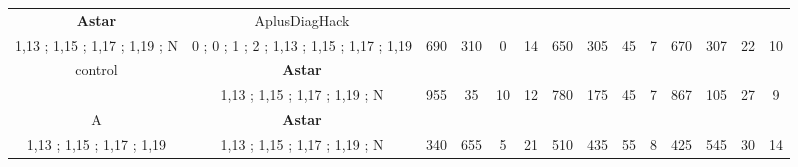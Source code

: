 \begin{table}[H]
{\begin{tabular}{|c|c|c|c|c|c|c|c|c|c|c|c|c|c|}
\cellcolor{blue!15}\textbf{Astar} & AplusDiagHack& {\color[HTML]{00009B} } & {\color[HTML]{9A0000} } & {\color[HTML]{009901} } &  & {\color[HTML]{00009B} } & {\color[HTML]{9A0000} } & {\color[HTML]{009901} } &  & {\color[HTML]{00009B} } & {\color[HTML]{9A0000} } & {\color[HTML]{009901} } &  \\ 
\cellcolor{ blue!15}1,13 ; 1,15 ; 1,17 ; 1,19 ; N & 0 ; 0 ; 1 ; 2 ; 1,13 ; 1,15 ; 1,17 ; 1,19 & \multirow{-2}{*}{{\color[HTML]{00009B} 690}} & \multirow{-2}{*}{{\color[HTML]{9A0000} 310}} & \multirow{-2}{*}{{\color[HTML]{009901} 0}} & \multirow{-2}{*}{14} & \multirow{-2}{*}{{\color[HTML]{00009B} 650}} & \multirow{-2}{*}{{\color[HTML]{9A0000} 305}} & \multirow{-2}{*}{{\color[HTML]{009901} 45}} & \multirow{-2}{*}{7} & \multirow{-2}{*}{{\color[HTML]{00009B} 670}} & \multirow{-2}{*}{{\color[HTML]{9A0000} 307}} & \multirow{-2}{*}{{\color[HTML]{009901} 22}} & \multirow{-2}{*}{10} \\ \hline

control & \cellcolor{blue!15}\textbf{Astar}& {\color[HTML]{00009B} } & {\color[HTML]{9A0000} } & {\color[HTML]{009901} } &  & {\color[HTML]{00009B} } & {\color[HTML]{9A0000} } & {\color[HTML]{009901} } &  & {\color[HTML]{00009B} } & {\color[HTML]{9A0000} } & {\color[HTML]{009901} } &  \\ 
 & \cellcolor{ blue!15}1,13 ; 1,15 ; 1,17 ; 1,19 ; N & \multirow{-2}{*}{{\color[HTML]{00009B} 955}} & \multirow{-2}{*}{{\color[HTML]{9A0000} 35}} & \multirow{-2}{*}{{\color[HTML]{009901} 10}} & \multirow{-2}{*}{12} & \multirow{-2}{*}{{\color[HTML]{00009B} 780}} & \multirow{-2}{*}{{\color[HTML]{9A0000} 175}} & \multirow{-2}{*}{{\color[HTML]{009901} 45}} & \multirow{-2}{*}{7} & \multirow{-2}{*}{{\color[HTML]{00009B} 867}} & \multirow{-2}{*}{{\color[HTML]{9A0000} 105}} & \multirow{-2}{*}{{\color[HTML]{009901} 27}} & \multirow{-2}{*}{9} \\ \hline

A & \cellcolor{blue!15}\textbf{Astar}& {\color[HTML]{00009B} } & {\color[HTML]{9A0000} } & {\color[HTML]{009901} } &  & {\color[HTML]{00009B} } & {\color[HTML]{9A0000} } & {\color[HTML]{009901} } &  & {\color[HTML]{00009B} } & {\color[HTML]{9A0000} } & {\color[HTML]{009901} } &  \\ 
1,13 ; 1,15 ; 1,17 ; 1,19 & \cellcolor{ blue!15}1,13 ; 1,15 ; 1,17 ; 1,19 ; N & \multirow{-2}{*}{{\color[HTML]{00009B} 340}} & \multirow{-2}{*}{{\color[HTML]{9A0000} 655}} & \multirow{-2}{*}{{\color[HTML]{009901} 5}} & \multirow{-2}{*}{21} & \multirow{-2}{*}{{\color[HTML]{00009B} 510}} & \multirow{-2}{*}{{\color[HTML]{9A0000} 435}} & \multirow{-2}{*}{{\color[HTML]{009901} 55}} & \multirow{-2}{*}{8} & \multirow{-2}{*}{{\color[HTML]{00009B} 425}} & \multirow{-2}{*}{{\color[HTML]{9A0000} 545}} & \multirow{-2}{*}{{\color[HTML]{009901} 30}} & \multirow{-2}{*}{14} \\ \hline


\end{tabular}}
\end{table}
